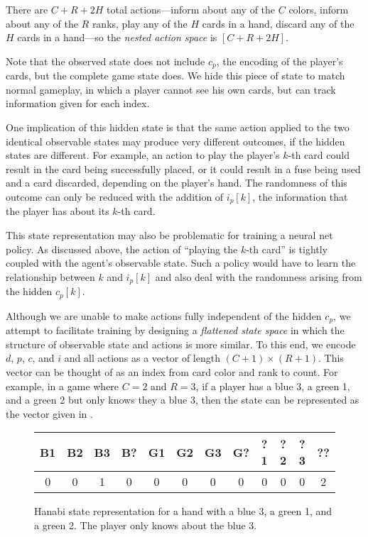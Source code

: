 There are $C + R + 2H$ total actions---inform about any of the $C$ colors,
inform about any of the $R$ ranks, play any of the $H$ cards in a hand, discard
any of the $H$ cards in a hand---so the \emph{nested action space} is $[C + R +
2H]$.

Note that the observed state does not include $c_p$, the encoding of the
player's cards, but the complete game state does. We hide this piece of state
to match normal gameplay, in which a player cannot see his own cards, but can
track information given for each index.

One implication of this hidden state is that the same action applied to the two
identical observable states may produce very different outcomes, if the hidden
states are different. For example, an action to play the player's $k$-th card
could result in the card being successfully placed, or it could result in a
fuse being used and a card discarded, depending on the player's hand. The
randomness of this outcome can only be reduced with the addition of $i_p[k]$, the
information that the player has about its $k$-th card.

This state representation may also be problematic for training a neural net
policy. As discussed above, the action of ``playing the $k$-th card'' is
tightly coupled with the agent's observable state. Such a policy would have to
learn the relationship between $k$ and $i_p[k]$ and also deal with the
randomness arising from the hidden $c_p[k]$.

Although we are unable to make actions fully independent of the hidden $c_p$,
we attempt to facilitate training by designing a \emph{flattened state space}
in which the structure of observable state and actions is more similar. To this
end, we encode $d$, $p$, $c$, and $i$ and all actions as a vector of length $(C
+ 1) \times (R + 1)$. This vector can be thought of as an index from card color
and rank to count. For example, in a game where $C = 2$ and $R = 3$, if a
player has a blue 3, a green 1, and a green 2 but only knows they a blue 3,
then the state can be represented as the vector given in
.

\begin{figure}[ht]
    \centering
    \begin{tabular}{c|c|c|c|c|c|c|c|c|c|c|c}
        B1 & B2 & B3 & B? & G1 & G2 & G3 & G? & ?1 & ?2 & ?3 & ?? \\\hline
        0  & 0  & 1  & 0  & 0  & 0  & 0  & 0  & 0  & 0  & 0  & 2
    \end{tabular}
    \caption{%
      Hanabi state representation for a hand with a blue 3, a green 1, and a
      green 2. The player only knows about the blue 3.
    }\label{fig:flattenedstate}
\end{figure}

